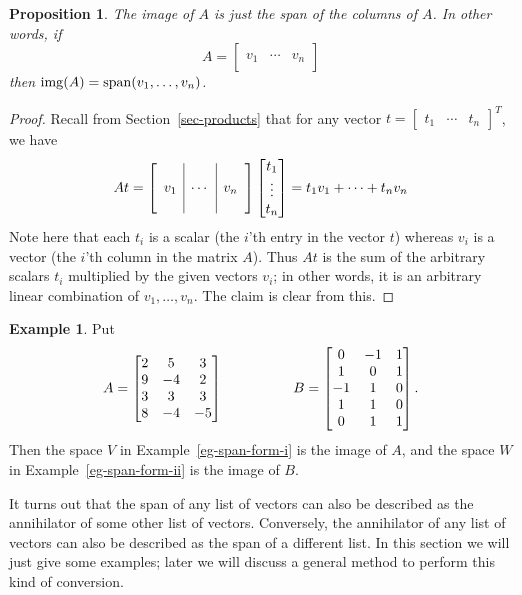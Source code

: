 \documentclass[reqno]{amsart}
\newtheorem{proposition}[theorem]{Proposition}
\theoremstyle{definition}
\newtheorem{example}[theorem]{Example}
\begin{document}
\begin{proposition}\label{prop-img-span}
 The image of $A$ is just the span of the columns of $A$.  In other
 words, if 
 \[ A = \left[\begin{array}{c|c|c}
        && \\ v_1 & \dotsb & v_n \\ &&
       \end{array}\right]
 \]
 then $\operatorname{img}(A)=\operatorname{span}(v_1,\dotsc,v_n)$.
\end{proposition}
\begin{proof}
 Recall from Section~\ref{sec-products} that
 for any vector $t = \begin{bmatrix} t_1 & \dotsb & t_n \end{bmatrix}^T$,
 we have
 \[ At = 
       \left[\begin{array}{c|c|c}
        && \\ v_1 & \dotsb & v_n \\ &&
       \end{array}\right] 
       \left[\begin{matrix} t_1 \\ \vdots \\ t_n \end{matrix}\right]
       = 
       t_1v_1 + \dotsb + t_nv_n
 \]
 Note here that each $t_i$ is a scalar (the $i$'th entry in the vector
 $t$) whereas $v_i$ is a vector (the $i$'th column in the matrix
 $A$).  Thus $At$ is the sum of the arbitrary scalars $t_i$ multiplied
 by the given vectors $v_i$; in other words, it is an arbitrary linear
 combination of $v_1,\dotsc,v_n$.  The claim is clear from this.
\end{proof}

\begin{example}\label{eg-img-span}
 Put
 \[ A =
    \left[\begin{matrix}
      2 &  5 &  3 \\
      9 & -4 &  2 \\
      3 &  3 &  3 \\
      8 & -4 & -5
    \end{matrix}\right]
    \hspace{5em}
    B = 
    \left[\begin{matrix}
      0 & -1 &  1 \\
      1 &  0 &  1 \\
     -1 &  1 &  0 \\
      1 &  1 &  0 \\
      0 &  1 &  1
    \end{matrix}\right]. 
 \]
 Then the space $V$ in Example~\ref{eg-span-form-i} is the image of
 $A$, and the space $W$ in Example~\ref{eg-span-form-ii} is the image
 of $B$.
\end{example}

It turns out that the span of any list of vectors can also be
described as the annihilator of some other list of vectors.  Conversely, the
annihilator of any list of vectors can also be described as the span
of a different list.  In this section we will just give some examples;
later we will discuss a general method to perform this kind of
conversion.
\end{document}
